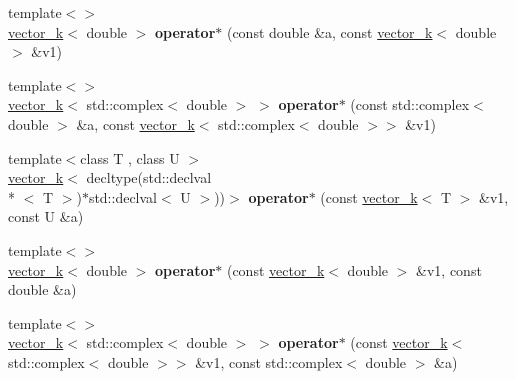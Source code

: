 \begin{DoxyCompactItemize}
\item 
\hypertarget{namespacekeycpp_ac7a042d0e04e0c610b5798017c8196d9}{{\footnotesize template$<$$>$ }\\\hyperlink{classkeycpp_1_1vector__k}{vector\-\_\-k}$<$ double $>$ {\bfseries operator$\ast$} (const double \&a, const \hyperlink{classkeycpp_1_1vector__k}{vector\-\_\-k}$<$ double $>$ \&v1)}\label{namespacekeycpp_ac7a042d0e04e0c610b5798017c8196d9}

\item 
\hypertarget{namespacekeycpp_a06de45116e1111f3aca66cd18565e9ba}{{\footnotesize template$<$$>$ }\\\hyperlink{classkeycpp_1_1vector__k}{vector\-\_\-k}$<$ std\-::complex$<$ double $>$ $>$ {\bfseries operator$\ast$} (const std\-::complex$<$ double $>$ \&a, const \hyperlink{classkeycpp_1_1vector__k}{vector\-\_\-k}$<$ std\-::complex$<$ double $>$$>$ \&v1)}\label{namespacekeycpp_a06de45116e1111f3aca66cd18565e9ba}

\item 
\hypertarget{namespacekeycpp_a05f53ae281350225540bf5b4f4d1259b}{{\footnotesize template$<$class T , class U $>$ }\\\hyperlink{classkeycpp_1_1vector__k}{vector\-\_\-k}$<$ decltype(std\-::declval\\*
$<$ T $>$)$\ast$std\-::declval$<$ U $>$))$>$ {\bfseries operator$\ast$} (const \hyperlink{classkeycpp_1_1vector__k}{vector\-\_\-k}$<$ T $>$ \&v1, const U \&a)}\label{namespacekeycpp_a05f53ae281350225540bf5b4f4d1259b}

\item 
\hypertarget{namespacekeycpp_ad7f693a660597bd39cdca67ea4000a81}{{\footnotesize template$<$$>$ }\\\hyperlink{classkeycpp_1_1vector__k}{vector\-\_\-k}$<$ double $>$ {\bfseries operator$\ast$} (const \hyperlink{classkeycpp_1_1vector__k}{vector\-\_\-k}$<$ double $>$ \&v1, const double \&a)}\label{namespacekeycpp_ad7f693a660597bd39cdca67ea4000a81}

\item 
\hypertarget{namespacekeycpp_ab34753e2fc26c9fab1fcbee6700c691b}{{\footnotesize template$<$$>$ }\\\hyperlink{classkeycpp_1_1vector__k}{vector\-\_\-k}$<$ std\-::complex$<$ double $>$ $>$ {\bfseries operator$\ast$} (const \hyperlink{classkeycpp_1_1vector__k}{vector\-\_\-k}$<$ std\-::complex$<$ double $>$$>$ \&v1, const std\-::complex$<$ double $>$ \&a)}\label{namespacekeycpp_ab34753e2fc26c9fab1fcbee6700c691b}


\end{DoxyCompactItemize}
